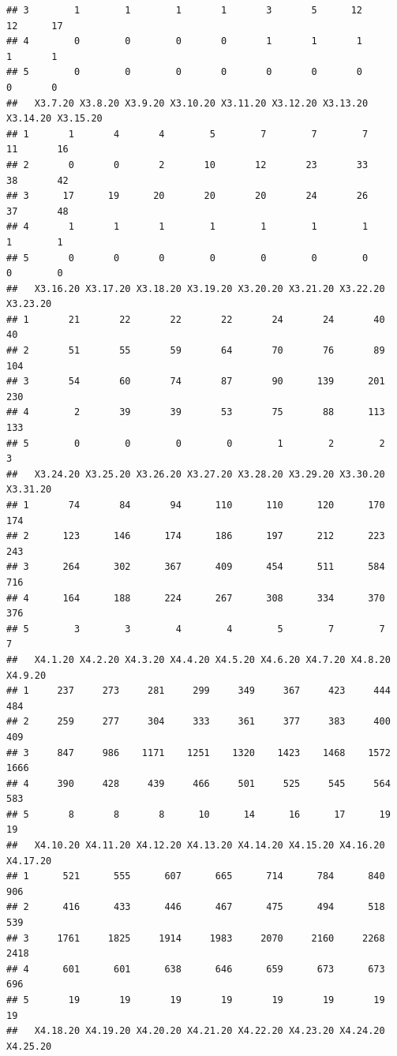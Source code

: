 \documentclass[]{article}
\begin{document}
\begin{verbatim}
## 3        1        1        1       1       3       5      12      12      17
## 4        0        0        0       0       1       1       1       1       1
## 5        0        0        0       0       0       0       0       0       0
##   X3.7.20 X3.8.20 X3.9.20 X3.10.20 X3.11.20 X3.12.20 X3.13.20 X3.14.20 X3.15.20
## 1       1       4       4        5        7        7        7       11       16
## 2       0       0       2       10       12       23       33       38       42
## 3      17      19      20       20       20       24       26       37       48
## 4       1       1       1        1        1        1        1        1        1
## 5       0       0       0        0        0        0        0        0        0
##   X3.16.20 X3.17.20 X3.18.20 X3.19.20 X3.20.20 X3.21.20 X3.22.20 X3.23.20
## 1       21       22       22       22       24       24       40       40
## 2       51       55       59       64       70       76       89      104
## 3       54       60       74       87       90      139      201      230
## 4        2       39       39       53       75       88      113      133
## 5        0        0        0        0        1        2        2        3
##   X3.24.20 X3.25.20 X3.26.20 X3.27.20 X3.28.20 X3.29.20 X3.30.20 X3.31.20
## 1       74       84       94      110      110      120      170      174
## 2      123      146      174      186      197      212      223      243
## 3      264      302      367      409      454      511      584      716
## 4      164      188      224      267      308      334      370      376
## 5        3        3        4        4        5        7        7        7
##   X4.1.20 X4.2.20 X4.3.20 X4.4.20 X4.5.20 X4.6.20 X4.7.20 X4.8.20 X4.9.20
## 1     237     273     281     299     349     367     423     444     484
## 2     259     277     304     333     361     377     383     400     409
## 3     847     986    1171    1251    1320    1423    1468    1572    1666
## 4     390     428     439     466     501     525     545     564     583
## 5       8       8       8      10      14      16      17      19      19
##   X4.10.20 X4.11.20 X4.12.20 X4.13.20 X4.14.20 X4.15.20 X4.16.20 X4.17.20
## 1      521      555      607      665      714      784      840      906
## 2      416      433      446      467      475      494      518      539
## 3     1761     1825     1914     1983     2070     2160     2268     2418
## 4      601      601      638      646      659      673      673      696
## 5       19       19       19       19       19       19       19       19
##   X4.18.20 X4.19.20 X4.20.20 X4.21.20 X4.22.20 X4.23.20 X4.24.20 X4.25.20

\end{verbatim}
\end{document}

